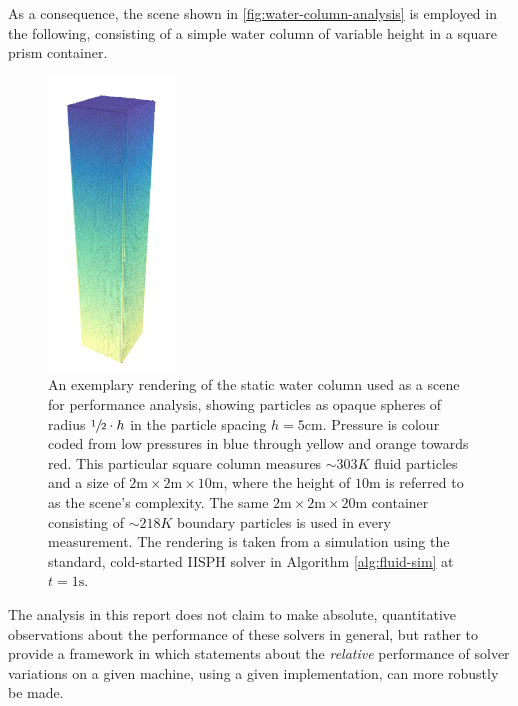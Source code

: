 \documentclass[oneside, a4paper]{book}
\begin{document}
  As a consequence, the scene shown in \autoref{fig:water-column-analysis} is employed in the following, consisting of a simple water column of variable height in a square prism container.

  \begin{figure}
    \centering
    \includegraphics[width=0.3\textwidth]{images/water_column_10m.png}
    \caption{An exemplary rendering of the static water column used as a scene for performance analysis, showing particles as opaque spheres of radius $\sfrac{1}{2}\cdot h$ in the particle spacing $h=5\text{cm}$. Pressure is colour coded from low pressures in blue through yellow and orange towards red. This particular square column measures $\sim 303K$ fluid particles and a size of $2\text{m}\times 2\text{m}\times 10\text{m}$, where the height of $10\text{m}$ is referred to as the scene's complexity. The same $2\text{m}\times 2\text{m}\times 20\text{m}$ container consisting of $\sim 218K$ boundary particles is used in every measurement. The rendering is taken from a simulation using the standard, cold-started IISPH solver in Algorithm \ref{alg:fluid-sim} at $t=1\text{s}$.}
    \label{fig:water-column-analysis}
  \end{figure}

  
  The analysis in this report does not claim to make absolute, quantitative observations about the performance of these solvers in general, but rather to provide a framework in which statements about the \textit{relative} performance of solver variations on a given machine, using a given implementation, can more robustly be made. 
  
\end{document}
